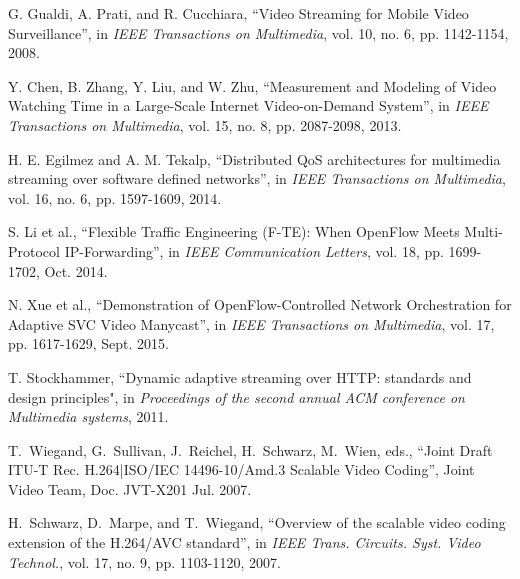 \documentclass[journal]{IEEEtran}
\begin{document}
%
%
%
\begin{thebibliography}{1}

G. Gualdi, A. Prati, and R. Cucchiara, ``Video Streaming for Mobile Video Surveillance'', in {\em IEEE Transactions on Multimedia}, vol. 10, no. 6, pp. 1142-1154, 2008.

Y. Chen, B. Zhang, Y. Liu, and W. Zhu, ``Measurement and Modeling of Video Watching Time in a Large-Scale Internet Video-on-Demand System'', in {\em IEEE Transactions on Multimedia}, vol. 15, no. 8, pp. 2087-2098, 2013.

H. E. Egilmez and A. M. Tekalp, ``Distributed QoS architectures for multimedia streaming over software defined networks'', in {\em IEEE Transactions on Multimedia}, vol. 16, no. 6, pp. 1597-1609, 2014.

S. Li et al., ``Flexible Traffic Engineering (F-TE): When OpenFlow Meets Multi-Protocol IP-Forwarding'', in {\em IEEE Communication Letters}, vol. 18, pp. 1699-1702, Oct. 2014.

N. Xue et al., ``Demonstration of OpenFlow-Controlled Network Orchestration for Adaptive SVC Video Manycast'', in {\em IEEE Transactions on Multimedia}, vol. 17, pp. 1617-1629, Sept. 2015.

T. Stockhammer, ``Dynamic adaptive streaming over HTTP: standards and design principles", in {\em Proceedings of the second annual ACM conference on Multimedia systems}, 2011.

T.~Wiegand, G.~Sullivan, J.~Reichel, H.~Schwarz, M.~Wien, eds., ``Joint Draft ITU-T Rec. H.264|ISO/IEC 14496-10/Amd.3 Scalable Video Coding'', Joint Video Team, Doc. JVT-X201 Jul. 2007.

H.~Schwarz, D.~Marpe, and T.~Wiegand, ``Overview of the scalable video coding extension of the H.264/AVC standard'', in {\em IEEE Trans. Circuits. Syst. Video Technol.}, vol. 17, no. 9, pp. 1103-1120, 2007.


\end{thebibliography}
\end{document}

